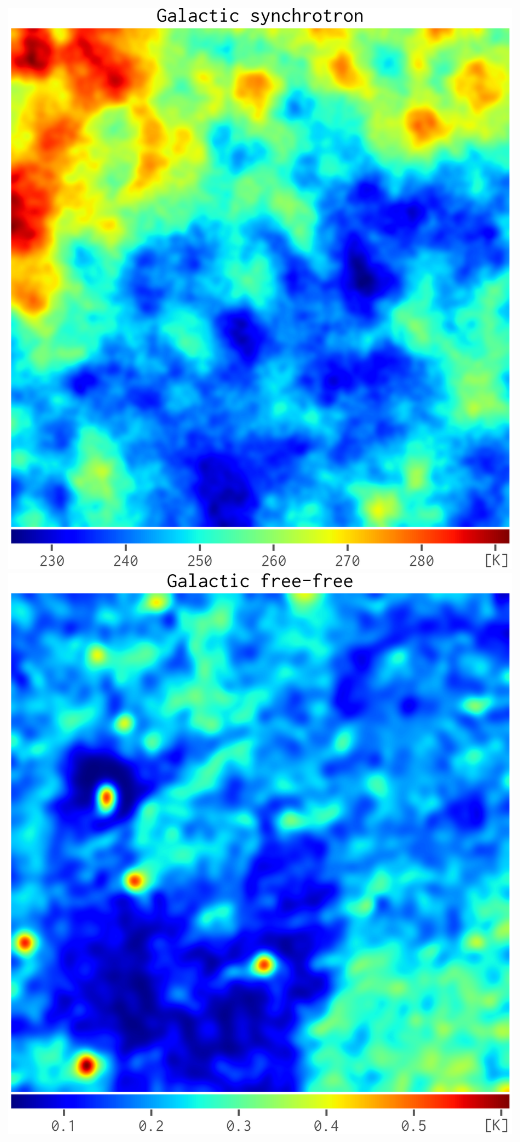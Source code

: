 \documentclass{beamer}
\begin{document}
\begin{frame}[c]{}
  \hfill \\
  \hfill
  \includegraphics[height=0.55\textheight]{skymap-gsyn-f158}
  \hspace{1em}
  \includegraphics[height=0.55\textheight]{skymap-gff-f158}
  \hfill
\end{frame}
\end{document}
